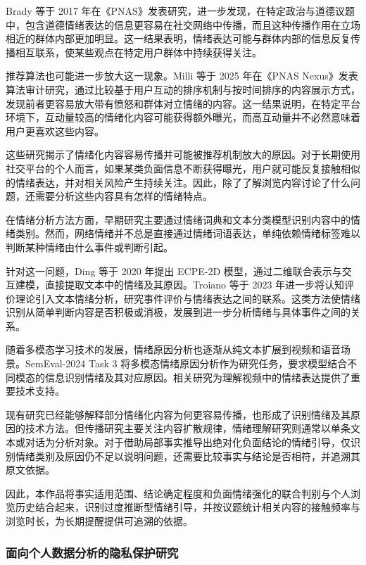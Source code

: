 Brady 等于 2017 年在《PNAS》发表研究，进一步发现，在特定政治与道德议题中，包含道德情绪表达的信息更容易在社交网络中传播，而且这种传播作用在立场相近的群体内部更加明显\cite{ref9}。这一结果表明，情绪表达可能与群体内部的信息反复传播相互联系，使某些观点在特定用户群体中持续获得关注。

推荐算法也可能进一步放大这一现象。Milli 等于 2025 年在《PNAS Nexus》发表算法审计研究，通过比较基于用户互动的排序机制与按时间排序的内容展示方式，发现前者更容易放大带有愤怒和群体对立情绪的内容\cite{ref37}。这一结果说明，在特定平台环境下，互动量较高的情绪化内容可能获得额外曝光，而高互动量并不必然意味着用户更喜欢这些内容。

这些研究揭示了情绪化内容容易传播并可能被推荐机制放大的原因。对于长期使用社交平台的个人而言，如果某类负面信息不断获得曝光，用户就可能反复接触相似的情绪表达，并对相关风险产生持续关注。因此，除了了解浏览内容讨论了什么问题，还需要分析这些内容具有怎样的情绪特点。

在情绪分析方法方面，早期研究主要通过情绪词典和文本分类模型识别内容中的情绪类别。然而，网络情绪并不总是直接通过情绪词语表达，单纯依赖情绪标签难以判断某种情绪由什么事件或判断引起。

针对这一问题，Ding 等于 2020 年提出 ECPE-2D 模型，通过二维联合表示与交互建模，直接提取文本中的情绪及其原因\cite{ref23}。Troiano 等于 2023 年进一步将认知评价理论引入文本情绪分析，研究事件评价与情绪表达之间的联系\cite{ref26}。这类方法使情绪识别从简单判断内容是否积极或消极，发展到进一步分析情绪与具体事件之间的关系。

随着多模态学习技术的发展，情绪原因分析也逐渐从纯文本扩展到视频和语音场景。SemEval-2024 Task 3 将多模态情绪原因分析作为研究任务，要求模型结合不同模态的信息识别情绪及其对应原因\cite{ref28}。相关研究为理解视频中的情绪表达提供了重要技术支持。

现有研究已经能够解释部分情绪化内容为何更容易传播，也形成了识别情绪及其原因的技术方法。但传播研究主要关注内容扩散规律，情绪理解研究则通常以单条文本或对话为分析对象。对于借助局部事实推导出绝对化负面结论的情绪引导，仅识别情绪类别及原因仍不足以说明问题，还需要比较事实与结论是否相符，并追溯其原文依据。

因此，本作品将事实适用范围、结论确定程度和负面情绪强化的联合判别与个人浏览历史结合起来，识别过度推断型情绪引导，并按议题统计相关内容的接触频率与浏览时长，为长期提醒提供可追溯的依据。

\subsubsection{面向个人数据分析的隐私保护研究}\label{section:1.3.4}

